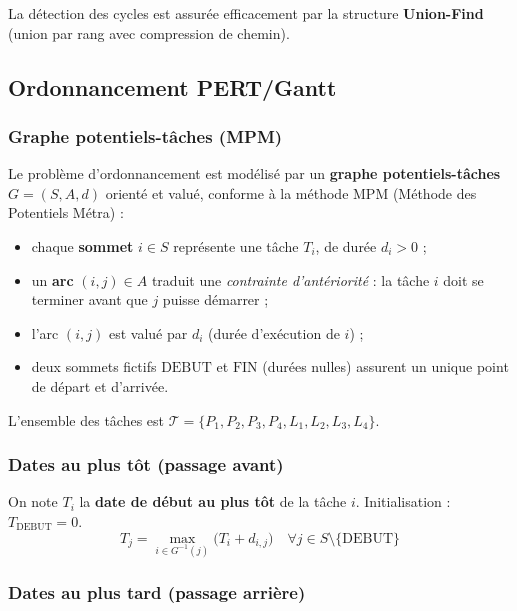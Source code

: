 \documentclass[12pt,a4paper]{article}
\begin{document}
La détection des cycles est assurée efficacement par la structure
\textbf{Union-Find} (union par rang avec compression de chemin).

\subsection{Ordonnancement PERT/Gantt}

\subsubsection{Graphe potentiels-tâches (MPM)}

Le problème d'ordonnancement est modélisé par un \textbf{graphe potentiels-tâches}
$G = (S, A, d)$ orienté et valué, conforme à la méthode MPM (Méthode des Potentiels
Métra) :
\begin{itemize}[noitemsep]
  \item chaque \textbf{sommet} $i \in S$ représente une tâche $T_i$, de durée $d_i > 0$ ;
  \item un \textbf{arc} $(i,j) \in A$ traduit une \emph{contrainte d'antériorité} :
        la tâche $i$ doit se terminer avant que $j$ puisse démarrer ;
  \item l'arc $(i,j)$ est valué par $d_i$ (durée d'exécution de $i$) ;
  \item deux sommets fictifs $\text{DEBUT}$ et $\text{FIN}$ (durées nulles) assurent
        un unique point de départ et d'arrivée.
\end{itemize}

L'ensemble des tâches est $\mathcal{T} = \{P_1, P_2, P_3, P_4, L_1, L_2, L_3, L_4\}$.

\subsubsection{Dates au plus tôt (passage avant)}

On note $T_i$ la \textbf{date de début au plus tôt} de la tâche $i$.
Initialisation : $T_{\text{DEBUT}} = 0$.
\[
T_j = \max_{i \in G^{-1}(j)}\bigl(T_i + d_{i,j}\bigr)
\quad\forall j \in S \setminus \{\text{DEBUT}\}
\]

\subsubsection{Dates au plus tard (passage arrière)}
\end{document}
